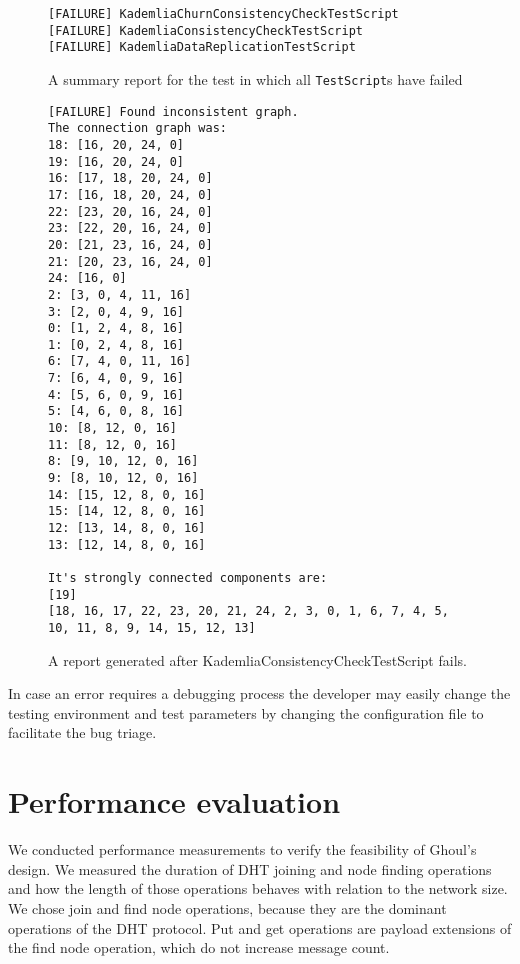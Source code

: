 \begin{figure}[tbp]
\begin{verbatim}
[FAILURE] KademliaChurnConsistencyCheckTestScript
[FAILURE] KademliaConsistencyCheckTestScript
[FAILURE] KademliaDataReplicationTestScript
\end{verbatim}
\caption{A summary report for the test in which all \texttt{TestScript}s have
failed}
\label{fig:sumrep_failure}
\end{figure}

\begin{figure}[tbp]
\begin{verbatim}
[FAILURE] Found inconsistent graph.
The connection graph was:
18: [16, 20, 24, 0]
19: [16, 20, 24, 0]
16: [17, 18, 20, 24, 0]
17: [16, 18, 20, 24, 0]
22: [23, 20, 16, 24, 0]
23: [22, 20, 16, 24, 0]
20: [21, 23, 16, 24, 0]
21: [20, 23, 16, 24, 0]
24: [16, 0]
2: [3, 0, 4, 11, 16]
3: [2, 0, 4, 9, 16]
0: [1, 2, 4, 8, 16]
1: [0, 2, 4, 8, 16]
6: [7, 4, 0, 11, 16]
7: [6, 4, 0, 9, 16]
4: [5, 6, 0, 9, 16]
5: [4, 6, 0, 8, 16]
10: [8, 12, 0, 16]
11: [8, 12, 0, 16]
8: [9, 10, 12, 0, 16]
9: [8, 10, 12, 0, 16]
14: [15, 12, 8, 0, 16]
15: [14, 12, 8, 0, 16]
12: [13, 14, 8, 0, 16]
13: [12, 14, 8, 0, 16]

It's strongly connected components are:
[19]
[18, 16, 17, 22, 23, 20, 21, 24, 2, 3, 0, 1, 6, 7, 4, 5, 10, 11, 8, 9, 14, 15, 12, 13]
\end{verbatim}
\caption{A report generated after KademliaConsistencyCheckTestScript fails.}
\label{fig:conrep}
\end{figure}

In case an error requires a debugging process the developer may easily change
the testing environment and test parameters by changing the configuration file
to facilitate the bug triage.

\section{Performance evaluation}
\label{sec:performance}

We conducted performance measurements to verify the feasibility of Ghoul's
design.
We measured the duration of DHT joining and node finding operations and how
the length of those operations behaves with relation to the network size.
We chose join and find node operations, because they are the dominant operations
of the DHT protocol.
Put and get operations are payload extensions of the find node operation,
which do not increase message count.

